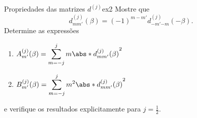 \begin{exercício}{Propriedades das matrizes \(d^{(j)}\)}{ex2}
   Mostre que
   \begin{equation*}
      d^{(j)}_{mm'}(\beta) = (-1)^{m - m'} d^{(j)}_{-m'{-m}}(-\beta).
   \end{equation*}
   Determine as expressões
   \begin{enumerate}[label=(\alph*)]
      \item \(\displaystyle A^{(j)}_{m'}(\beta) = \sum_{m = -j}^{j}{m \abs*{d^{(j)}_{mm'}(\beta)}^2}\)
      \item \(\displaystyle B^{(j)}_{m'}(\beta) = \sum_{m = -j}^{j}{m^2 \abs*{d^{(j)}_{mm'}(\beta)}^2}\)
   \end{enumerate}
   e verifique os resultados explicitamente para \(j = \frac12\).
\end{exercício}
